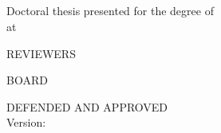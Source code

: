 \begin{titlepage}
    \begin{addmargin}[-1cm]{-2cm}
        \begin{center}
            \large

            \hfill

            \vfill
            \spacedlowsmallcaps{\myAuthor} \\ \bigskip
            \begingroup
                \color{Maroon}\spacedallcaps{\myTitle} \\ \bigskip
            \endgroup
            \vfill
            \mySubtitle{} \\ \bigskip

            \vspace{3pt}
            \vfill

            \def\svgwidth{.5\textwidth}
             \\ \medskip


            \vfill{}
        \end{center}

        \noindent
        Doctoral thesis presented for the degree of\\
        \myDegree{} at

        \medskip{}

        \noindent
        \myInstitute{}\bigskip

        \vfill

        \noindent
        REVIEWERS\\
        \myReviewers{}\bigskip

        \noindent
        BOARD\\
        \myBoard{}\bigskip

        \noindent
	    \ifdefined \myDefense
	    DEFENDED AND APPROVED\\\myDefense
	    \else
	    Version: \myVersion
	    \fi

    \end{addmargin}
\end{titlepage}
